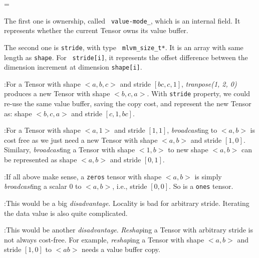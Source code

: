 {\leftskip=\parskip

  \quad The first one is ownership, called {\tt
  value-mode\_}, which is an internal field. It represents whether the current
  Tensor owns its value buffer.

  \quad The second one is {\tt stride}, with type {\tt
  mlvm\_size\_t*}.  It is an array with same length as {\tt shape}. For {\tt
  stride[i]}, it represents the offset difference between the dimension
  increment at dimension {\tt shape[i]}.

  {\leftskip

    :\quad For a Tensor with shape $<a,b, c>$ and stride
    $[bc, c, 1]$, {\it tranpose(1, 2, 0)} produces a new Tensor with shape $<b,
    c, a>$. With {\tt stride} property, we could re-use the same value buffer,
    saving the copy cost, and represent the new Tensor as: shape $<b, c, a>$ and
    stride $[c, 1, bc]$.

    :\quad For a Tensor with shape $<a, 1>$ and stride
    $[1, 1]$, {\it broadcast\/}ing to $<a,b>$ is cost free as we just need a new
    Tensor with shape $<a,b>$ and stride $[1, 0]$. Similary, {\it
    broadcast\/}ing a Tensor with shape $<1, b>$ to new shape $<a,b>$ can be
    represented as shape $<a,b>$ and stride $[0, 1]$.

    :\quad If all above make sense, a {\tt zeros} tensor
    with shape $<a,b>$ is simply {\it broadcast\/}ing a scalar $0$ to $<a,b>$,
    i.e., stride $[0, 0]$. So is a {\tt ones} tensor.

    :\quad This would be a big {\it disadvantage}.
    Locality is bad for arbitrary stride. Iterating the data value is also quite
    complicated.

    :\quad This would be another {\it disadvantage}.
    {\it Reshap\/}ing a Tensor with arbitrary stride is not always cost-free.
    For example, {\it reshap\/}ing a Tensor with shape $<a,b>$ and stride $[1,
    0]$ to $<ab>$ needs a value buffer copy.

  \par}
\par}

\bye
